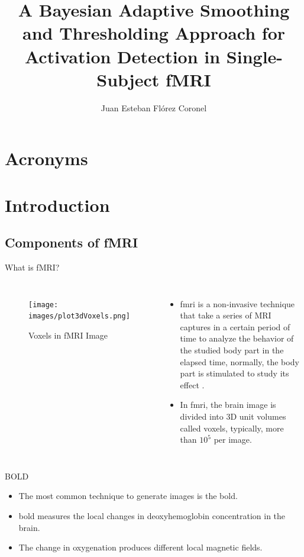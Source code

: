 \documentclass{beamer}
\title[bFAST in Single-Subject fMRI]{A Bayesian Adaptive Smoothing and 
Thresholding Approach for Activation Detection in 
Single-Subject fMRI}
\author[J. Flórez-Coronel]{Juan Esteban Flórez Coronel}
\begin{document}
\typesetFrontSlides


\section{Acronyms}

\begin{frame}
\end{frame}

\section{Introduction}

\subsection[fMRI]{Components of fMRI}

\begin{frame}{What is fMRI?}
\begin{columns}
\begin{figure}
\centering
\texttt{[image: images/plot3dVoxels.png]}
\caption{Voxels in fMRI Image}
\label{fig:fMRI}
\end{figure}
\begin{itemize}
\item \gls{fmri} is a non-invasive technique that take a series of MRI captures
in a certain period of time to analyze the behavior of the studied body part 
in the elapsed time, normally, the body part is stimulated to study its effect
 \cite{buchbinder2016functional}.
\item In \gls{fmri}, the brain image is divided into 3D unit volumes called voxels, 
typically, more than $10^5$ per image.
\end{itemize}
\end{columns}
\end{frame}

\begin{frame}{BOLD}
\begin{itemize}
\item The most common technique to generate images is the \gls{bold}.
\item \gls{bold} measures the local changes in deoxyhemoglobin 
concentration in the brain.
\item The change in oxygenation produces different local magnetic fields.
\end{itemize}
\end{frame}
\end{document}
